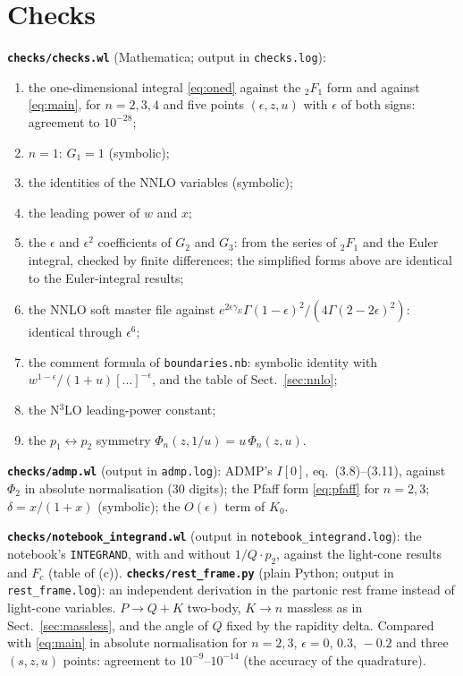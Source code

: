 \documentclass[11pt,a4paper]{article}
\newcommand{\ep}{\epsilon}
\newcommand{\F}{{}_2F_1}
\begin{document}
\section{Checks}
\label{sec:checks}
\textbf{\texttt{checks/checks.wl}} (Mathematica; output in \texttt{checks.log}):
\begin{enumerate}
\item the one-dimensional integral \eqref{eq:oned} against the $\F$ form and against \eqref{eq:main}, for $n=2,3,4$
  and five points $(\ep,z,u)$ with $\ep$ of both signs: agreement to $10^{-28}$;
\item $n=1$: $G_1=1$ (symbolic);
\item the identities of the NNLO variables (symbolic);
\item the leading power of $w$ and $x$;
\item the $\ep$ and $\ep^2$ coefficients of $G_2$ and $G_3$: from the series of $\F$ and the Euler integral, checked
  by finite differences; the simplified forms above are identical to the Euler-integral results;
\item the NNLO soft master file against $e^{2\ep\gamma_E}\Gamma(1-\ep)^2/(4\Gamma(2-2\ep)^2)$: identical through $\ep^6$;
\item the comment formula of \texttt{boundaries.nb}: symbolic identity with $w^{1-\ep}/(1+u)[\dots]^{-\ep}$, and the
  table of Sect.~\ref{sec:nnlo};
\item the N$^3$LO leading-power constant;
\item the $p_1\leftrightarrow p_2$ symmetry $\Phi_n(z,1/u)=u\,\Phi_n(z,u)$.
\end{enumerate}
\textbf{\texttt{checks/admp.wl}} (output in \texttt{admp.log}): ADMP's $I[0]$, eq.~(3.8)--(3.11), against
$\Phi_2$ in absolute normalisation (30 digits); the Pfaff form \eqref{eq:pfaff} for $n=2,3$; $\delta=x/(1+x)$
(symbolic); the $O(\ep)$ term of $K_0$.

\textbf{\texttt{checks/notebook\_integrand.wl}} (output in \texttt{notebook\_integrand.log}): the notebook's
\texttt{INTEGRAND}, with and without $1/Q\cdot p_2$, against the light-cone results and $F_c$ (table of (c)).
\textbf{\texttt{checks/rest\_frame.py}} (plain Python; output in \texttt{rest\_frame.log}): an independent
derivation in the partonic rest frame instead of light-cone variables. $P\to Q+K$ two-body, $K\to n$ massless as in
Sect.~\ref{sec:massless}, and the angle of $Q$ fixed by the rapidity delta. Compared with \eqref{eq:main} in absolute
normalisation for $n=2,3$, $\ep=0,\,0.3,\,-0.2$ and three $(s,z,u)$ points: agreement to $10^{-9}$--$10^{-14}$ (the
accuracy of the quadrature).
\end{document}
